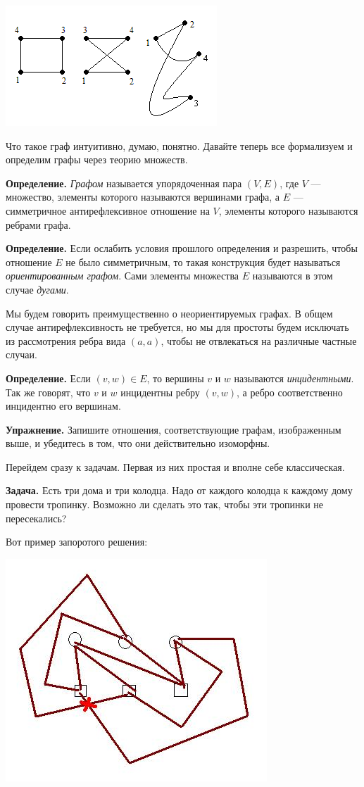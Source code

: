 \includegraphics{isomorphic_graphs.png}

Что такое граф интуитивно, думаю, понятно. Давайте теперь все формализуем и определим графы через теорию множеств.

{\bfseries Определение.} {\slshape Графом} называется упорядоченная пара $(V, E)$, где $V$ — множество, элементы которого называются вершинами графа, а $E$ — симметричное антирефлексивное отношение на $V$, элементы которого называются ребрами графа.

{\bfseries Определение.} Если ослабить условия прошлого определения и разрешить, чтобы отношение $E$ не было симметричным, то такая конструкция будет называться {\slshape ориентированным графом}. Сами элементы множества $E$ называются в этом случае {\slshape дугами}.

Мы будем говорить преимущественно о неориентируемых графах. В общем случае антирефлексивность не требуется, но мы для простоты будем исключать из рассмотрения ребра вида $(a, a)$, чтобы не отвлекаться на различные частные случаи.

{\bfseries Определение.} Если $(v, w) \in E$, то вершины $v$ и $w$ называются {\slshape инцидентными}. Так же говорят, что $v$ и $w$ инцидентны ребру $(v, w)$, а ребро соответственно инцидентно его вершинам.

{\bfseries Упражнение.} Запишите отношения, соответствующие графам, изображенным выше, и убедитесь в том, что они действительно изоморфны.

Перейдем сразу к задачам. Первая из них простая и вполне себе классическая.

{\bfseries Задача.} Есть три дома и три колодца. Надо от каждого колодца к каждому дому провести тропинку. Возможно ли сделать это так, чтобы эти тропинки не пересекались?

Вот пример запоротого решения:

\includegraphics{bells.jpg}

